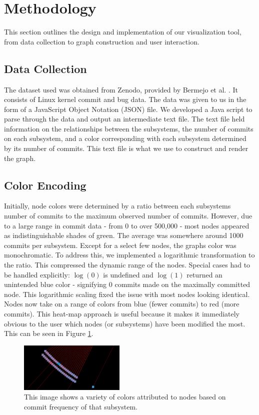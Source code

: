 \documentclass[conference]{IEEEtran}
\begin{document}
\section{Methodology}
\label{method}

This section outlines the design and implementation of our visualization tool, from data collection to graph construction and user interaction.

\subsection{Data Collection}
The dataset used was obtained from Zenodo, provided by Bermejo et al. \cite{zenodo}. It consists of Linux kernel commit and bug data. The data was given to us in the form of a JavaScript Object Notation (JSON) file. We developed a Java script to parse through the data and output an intermediate text file. The text file held information on the relationships between the subsystems, the number of commits on each subsystem, and a color corresponding with each subsystem determined by its number of commits. This text file is what we use to construct and render the graph.

\subsection{Color Encoding}
Initially, node colors were determined by a ratio between each subsystems number of commits to the maximum observed number of commits. However, due to a large range in commit data - from 0 to over 500,000 - most nodes appeared as indistinguishable shades of green. The average was somewhere around 1000 commits per subsystem. Except for a select few nodes, the graphs color was monochromatic. To address this, we implemented a logarithmic transformation to the ratio. This compressed the dynamic range of the nodes. Special cases had to be handled explicitly: $\log(0)$ is undefined and $\log(1)$ returned an unintended blue color - signifying $0$ commits made on the maximally committed node. This logarithmic scaling fixed the issue with most nodes looking identical. Nodes now take on a range of colors from blue (fewer commits) to red (more commits). This heat-map approach is useful because it makes it immediately obvious to the user which nodes (or subsystems) have been modified the most. This can be seen in Figure \ref{in}.

\begin{figure}[h!]
	\centering
	\includegraphics[width=0.45\textwidth]{randomSection.png}
	\caption{This image shows a variety of colors attributed to nodes based on commit frequency of that subsystem.}
	\label{in}
\end{figure}
\end{document}
